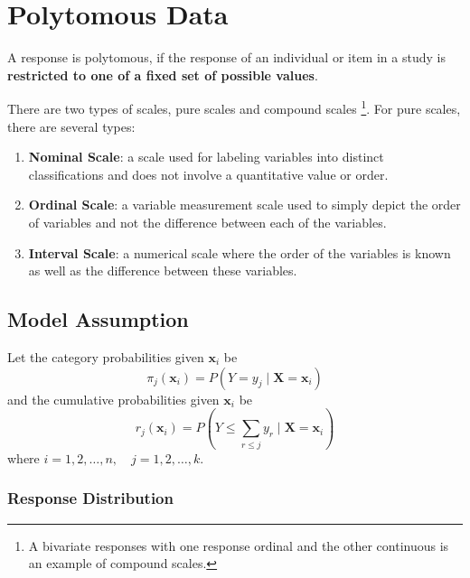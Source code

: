 \chapter{Polytomous Data}

\begin{definition}
    A response is polytomous, if the response of an individual or item in a study is \textbf{restricted to one of a fixed set of possible values}.
\end{definition}

\begin{remark}
    There are two types of scales, pure scales and compound scales \footnote{A bivariate responses with one response ordinal and the other continuous is an example of compound scales.}. For pure scales, there are several types:
    \begin{enumerate}
        \item \textbf{Nominal Scale}: a scale used for labeling variables into distinct classifications and does not involve a quantitative value or order.
        \item \textbf{Ordinal Scale}: a variable measurement scale used to simply depict the order of variables and not the difference between each of the variables.
        \item \textbf{Interval Scale}: a numerical scale where the order of the variables is known as well as the difference between these variables.
    \end{enumerate}
\end{remark}

\section{Model Assumption}

Let the category probabilities given $\mathbf{x}_{i}$ be
\begin{equation}
    \pi_{j}\left(\mathbf{x}_{i}\right)=P\left(Y=y_{j}\mid\mathbf{X}=\mathbf{x}_{i}\right)
\end{equation}
and the cumulative probabilities given $\mathbf{x}_{i}$ be
\begin{equation}
    r_{j}\left(\mathbf{x}_{i}\right)=P\left(Y\leq\sum_{r\leq j}y_{r}\mid\mathbf{X}=\mathbf{x}_{i}\right)
\end{equation}
where $i=1,2,\ldots,n,\quad j=1,2,\ldots,k$.

\subsection{Response Distribution}

